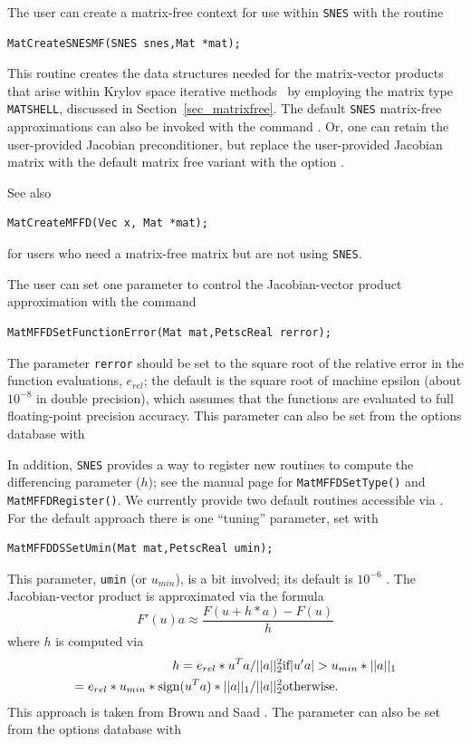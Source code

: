 The user can create a matrix-free context for use within \lstinline{SNES} with
the routine
\begin{lstlisting}
MatCreateSNESMF(SNES snes,Mat *mat);
\end{lstlisting}
This routine creates the data structures needed for the matrix-vector
products that arise within Krylov space iterative methods~\cite{brownsaad:90}
by employing the matrix type \lstinline{MATSHELL},
discussed in Section~\ref{sec_matrixfree}.  The default \lstinline{SNES} matrix-free
approximations can also be invoked with the command . 
Or, one can retain the user-provided Jacobian preconditioner, but replace the
user-provided Jacobian matrix with the default matrix free variant with the
option . 

See also
\begin{lstlisting}
MatCreateMFFD(Vec x, Mat *mat);
\end{lstlisting}
for users who need a matrix-free matrix but are not using \lstinline{SNES}.

The user can set one parameter to control the Jacobian-vector
product approximation with the command
\begin{lstlisting}
MatMFFDSetFunctionError(Mat mat,PetscReal rerror);
\end{lstlisting}
The parameter \lstinline{rerror} should be set to the square root of the
relative error in the function evaluations, $e_{rel}$; the default is the square root of machine epsilon (about $10^{-8}$ in double precision),
which assumes that the functions are evaluated to full floating-point precision accuracy.
This parameter can also be set from the options database with

In addition, \lstinline{SNES} provides a way to register new routines to compute the differencing parameter ($h$);
see the manual page for \lstinline{MatMFFDSetType()} and \lstinline{MatMFFDRegister()}. We currently provide two default routines accessible via
.
For the default approach there is one ``tuning'' parameter, set with
\begin{lstlisting}
MatMFFDDSSetUmin(Mat mat,PetscReal umin);
\end{lstlisting}
This parameter, \lstinline{umin} (or $u_{min}$), is a bit involved; its default is
$ 10^{-6} $ . The Jacobian-vector product is approximated via the formula
\[
    F'(u) a \approx \frac{F(u + h*a) - F(u)}{h}
\]
where $ h $ is computed via
\begin{eqnarray*}
h = e_{rel}*u^{T}a/||a||^2_2                                 & \hbox{if}  |u'a| > u_{min}*||a||_{1} \\
  = e_{rel}*u_{min}*\text{sign}(u^{T}a)*||a||_{1}/||a||^2_2  & \hbox{otherwise}.
\end{eqnarray*}
This approach is taken from Brown and Saad \cite{brownsaad:90}.
The parameter can also be set from the options database with

